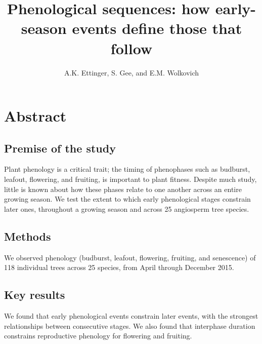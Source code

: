 \documentclass{article}
\begin{document}

\title{Phenological sequences: how early-season events define those that follow} %
\author{A.K. Ettinger, S. Gee, and E.M. Wolkovich}
\maketitle  %


\section*{Abstract}
\subsection*{Premise of the study}
Plant phenology is a critical trait; the timing of phenophases such as budburst, leafout, flowering, and fruiting, is important to plant fitness. Despite much study, little is known about how these phases relate to one another across an entire growing season. We test the extent to which early phenological stages constrain later ones, throughout a growing season and across 25 angiosperm tree species. 
\subsection*{Methods}
We observed phenology (budburst, leafout, flowering, fruiting, and senescence) of 118 individual trees across 25 species, from April through December 2015. 
\subsection*{Key results}
We found that early phenological events constrain later events, with the strongest relationships between consecutive stages. We also found that interphase duration constrains reproductive phenology for flowering and fruiting.
\end{document}
